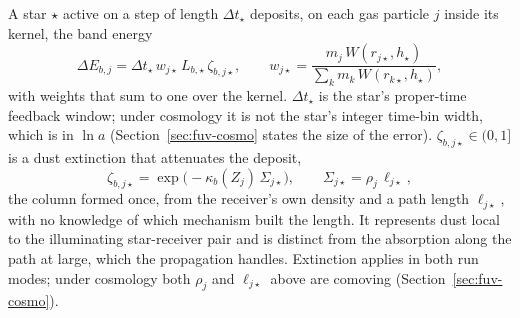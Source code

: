 A star $\star$ active on a step of length $\Delta t_\star$ deposits, on
each gas particle $j$ inside its kernel, the band energy
\begin{equation}
  \Delta E_{b,j} = \Delta t_\star\, w_{j\star}\, L_{b,\star}\,
    \zeta_{b,j\star} , \qquad
  w_{j\star} = \frac{m_j\,W(r_{j\star}, h_\star)}
                    {\sum_k m_k\,W(r_{k\star}, h_\star)} ,
  \label{eq:fuv-inject}
\end{equation}
with weights that sum to one over the kernel. $\Delta t_\star$ is the
star's proper-time feedback window; under cosmology it is not the
star's integer time-bin width, which is in $\ln a$
(Section~\ref{sec:fuv-cosmo} states the size of the error).
$\zeta_{b,j\star}\in(0,1]$ is
a dust extinction that attenuates the deposit,
\begin{equation}
  \zeta_{b,j\star} = \exp\!\big(-\kappa_b(Z_j)\,\Sigma_{j\star}\big) , \qquad
  \Sigma_{j\star} = \rho_j\,\ell_{j\star} ,
  \label{eq:fuv-extinction}
\end{equation}
the column formed once, from the receiver's own density and a path
length $\ell_{j\star}$, with no knowledge of which mechanism built the
length.
It represents dust local to the illuminating star-receiver pair and is
distinct from the absorption along the path at large, which the
propagation handles. Extinction applies in both run modes; under
cosmology both $\rho_j$ and $\ell_{j\star}$ above are comoving
(Section~\ref{sec:fuv-cosmo}).

